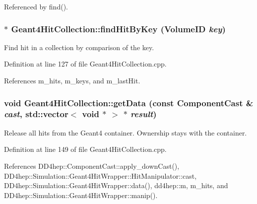 Referenced by find().\hypertarget{class_d_d4hep_1_1_simulation_1_1_geant4_hit_collection_a912bb8ef9922058b0dbb3dbc5ee116bc}{
\subsubsection[{findHitByKey}]{ $\ast$ Geant4HitCollection::findHitByKey (VolumeID {\em key})}}
\label{class_d_d4hep_1_1_simulation_1_1_geant4_hit_collection_a912bb8ef9922058b0dbb3dbc5ee116bc}


Find hit in a collection by comparison of the key. 

Definition at line 127 of file Geant4HitCollection.cpp.

References m\_\-hits, m\_\-keys, and m\_\-lastHit.\hypertarget{class_d_d4hep_1_1_simulation_1_1_geant4_hit_collection_a3374851f839f6caf7eb95aa84aa4d5a8}{
\subsubsection[{getData}]{\setlength{\rightskip}{0pt plus 5cm}void Geant4HitCollection::getData (const {\bf ComponentCast} \& {\em cast}, \/  std::vector$<$ void $\ast$ $>$ $\ast$ {\em result})}}
\label{class_d_d4hep_1_1_simulation_1_1_geant4_hit_collection_a3374851f839f6caf7eb95aa84aa4d5a8}


Release all hits from the Geant4 container. Ownership stays with the container. 

Definition at line 149 of file Geant4HitCollection.cpp.

References DD4hep::ComponentCast::apply\_\-downCast(), DD4hep::Simulation::Geant4HitWrapper::HitManipulator::cast, DD4hep::Simulation::Geant4HitWrapper::data(), dd4hep::m, m\_\-hits, and DD4hep::Simulation::Geant4HitWrapper::manip().

